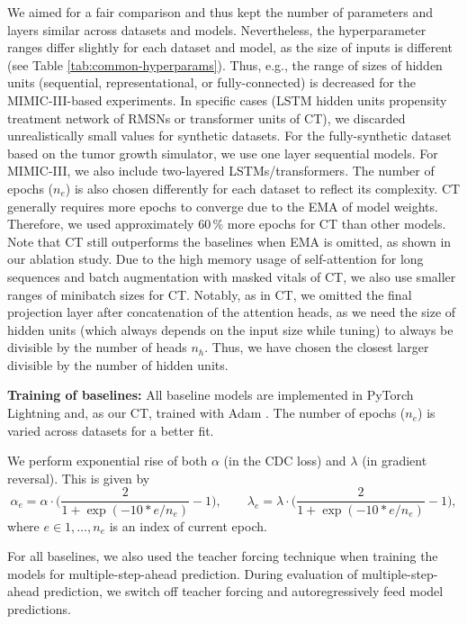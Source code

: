 \documentclass{article}
\theoremstyle{plain}
\theoremstyle{definition}
\theoremstyle{remark}
\newcommand{\shortname}{CT\xspace}
\begin{document}
We aimed for a fair comparison and thus kept the number of parameters and layers similar across datasets and models. Nevertheless, the hyperparameter ranges differ slightly for each dataset and model, as the size of inputs is different (see Table \ref{tab:common-hyperparams}). Thus, e.g., the range of sizes of hidden units (sequential, representational, or fully-connected) is decreased for the MIMIC-III-based experiments. In specific cases (LSTM hidden units propensity treatment network of RMSNs or transformer units of \shortname), we discarded unrealistically small values for synthetic datasets. For the fully-synthetic dataset based on the tumor growth simulator, we use one layer sequential models. For MIMIC-III, we also include two-layered LSTMs/transformers. The number of epochs ($n_e$) is also chosen differently for each dataset to reflect its complexity. \shortname generally requires more epochs to converge due to the EMA of model weights. Therefore, we used approximately 60\,\% more epochs for \shortname than other models. Note that \shortname still outperforms the baselines when EMA is omitted, as shown in our ablation study. Due to the high memory usage of self-attention for long sequences and batch augmentation with masked vitals of \shortname, we also use smaller ranges of minibatch sizes for \shortname.  Notably, as in \shortname, we omitted the final projection layer after concatenation of the attention heads, as we need the size of hidden units (which always depends on the input size while tuning) to always be divisible by the number of heads $n_h$. Thus, we have chosen the closest larger divisible by the number of hidden units. 

\textbf{Training of baselines:} All baseline models are implemented in PyTorch Lightning and, as our \shortname, trained with Adam \cite{kingma2014adam}. The number of epochs ($n_e$) is varied across datasets for a better fit. 

We perform exponential rise of both $\alpha$ (in the CDC loss) and $\lambda$ (in gradient reversal). This is given by
\begin{equation}
    \alpha_e = \alpha \cdot \Big(\frac{2}{1 + \exp (-10 * e / n_e)} - 1 \Big), \quad \quad \lambda_e = \lambda \cdot \Big(\frac{2}{1 + \exp (-10 * e / n_e)} - 1 \Big) ,
\end{equation}
where $e \in 1, \ldots, n_e$ is an index of current epoch.

For all baselines, we  also used the teacher forcing technique \cite{williams1989learning} when training the models for multiple-step-ahead prediction. During evaluation of multiple-step-ahead prediction, we switch off teacher forcing and autoregressively feed model predictions. 
\end{document}
